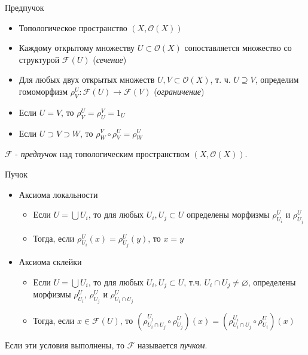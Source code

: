 \documentclass{beamer}
\begin{document}
\begin{frame}{Предпучок}
\begin{itemize}
	\item Топологическое пространство $(X, \mathcal{O}(X))$
	\item Каждому открытому множеству $U \subset \mathcal{O}(X)$ сопоставляется множество со структурой $\mathcal{F}(U)$ (\textit{сечение})
	\item Для любых двух открытых множеств $U, V \subset \mathcal{O}(X)$, т. ч. $U \supseteq V$, определим гомоморфизм $\rho^U_V : \mathcal{F}(U) \to \mathcal{F}(V)$ (\textit{ограничение})
	\item Если $U = V$, то $\rho^U_V = \rho^V_U = 1_U$
	\item Если $U \supset V \supset W$, то $\rho^V_W \circ \rho^U_V = \rho^U_W$
\end{itemize}
\bigskip
$\mathcal{F}$ - \textit{предпучок} над топологическим пространством $(X, \mathcal{O}(X))$.
\end{frame}

\begin{frame}{Пучок}
\begin{itemize}
	\item Аксиома локальности
		\medskip
		\begin{itemize}
			\item Если $U = \bigcup U_i$, то для любых $U_i, U_j \subset U$ определены морфизмы $\rho^U_{U_i}$ и $\rho^U_{U_j}$
			\medskip
			\item Тогда, если $\rho^U_{U_i}(x) = \rho^U_{U_j}(y)$, то $x = y$
		\end{itemize}
	\bigskip
	\item Аксиома склейки
		\medskip
		\begin{itemize}
			\item Если $U = \bigcup U_i$, то для любых $U_i, U_j \subset U$, т.ч. $U_i \cap U_j \neq \varnothing$, определены морфизмы $\rho^U_{U_i}$, $\rho^U_{U_j}$ и $\rho^U_{U_i \cap U_j}$
			\medskip
			\item Тогда, если $x \in \mathcal{F}(U)$, то $(\rho^{U_j}_{U_i \cap U_j} \circ \rho^U_{U_j})(x) = (\rho^{U_i}_{U_i \cap U_j} \circ \rho^U_{U_i})(x)$
		\end{itemize}
\end{itemize}
\bigskip
Если эти условия выполнены, то $\mathcal{F}$ называется \textit{пучком}.
\end{frame}
\end{document}
